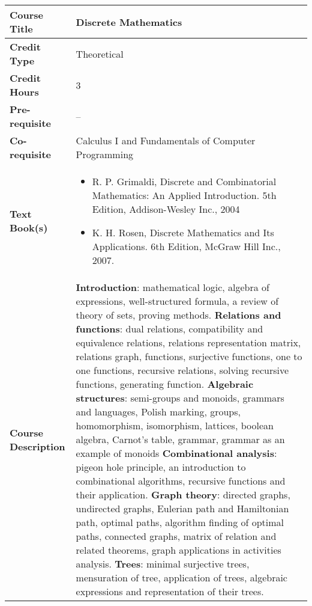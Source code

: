 \documentclass[11pt]{article}
\begin{document}
\begin{table}[h!]
\begin{tabular}{|l|l|}
\hline
\textbf{Course Title}       &   Discrete Mathematics\\ \hline
\textbf{Credit Type}        &  Theoretical \\ \hline
\textbf{Credit Hours}       & 3 \\ \hline
\textbf{Pre-requisite}       &  --\\ \hline
\textbf{Co-requisite}       &  Calculus I and Fundamentals of Computer Programming\\ \hline
\textbf{Text Book(s)}       & \begin{minipage}{.70\textwidth}
\begin{itemize} \itemsep-0.4em
	\vspace{3mm}
	\item R. P. Grimaldi, Discrete and Combinatorial Mathematics: An Applied Introduction. 5th Edition, Addison-Wesley Inc., 2004
	\item K. H. Rosen, Discrete Mathematics and Its Applications. 6th Edition, McGraw Hill Inc., 2007.
	\vspace{3mm}
\end{itemize}
\end{minipage}\\ \hline
\textbf{Course Description} & \begin{minipage}{.70\textwidth}
\vspace{3mm}
\textbf{Introduction}: mathematical logic, algebra of expressions, well-structured formula, a review of theory of
sets, proving methods. \newline
\textbf{Relations and functions}: dual relations, compatibility and equivalence relations, relations
representation matrix, relations graph, functions, surjective functions, one to one functions, recursive
relations, solving recursive functions, generating function.\newline
\textbf{Algebraic structures}: semi-groups and monoids, grammars and languages, Polish marking, groups,
homomorphism, isomorphism, lattices, boolean algebra, Carnot’s table, grammar, grammar as an
example of monoids\newline
\textbf{Combinational analysis}: pigeon hole principle, an introduction to combinational algorithms, recursive
functions and their application.\newline
\textbf{Graph theory}: directed graphs, undirected graphs, Eulerian path and Hamiltonian path, optimal paths,
algorithm finding of optimal paths, connected graphs, matrix of relation and related theorems, graph
applications in activities analysis.\newline
\textbf{Trees}: minimal surjective trees, mensuration of tree, application of trees, algebraic expressions and
representation of their trees.
\vspace{3mm}
\end{minipage} \\ \hline
\end{tabular}
\end{table}
\end{document}
